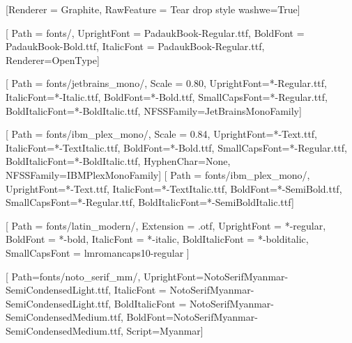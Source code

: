 \setmainfont[
    Path = fonts/,
    UprightFont = PadaukBook-Regular.ttf,
    BoldFont = PadaukBook-Bold.ttf,
    ItalicFont = PadaukBook-Regular.ttf,    
]{Padauk Book}
[Renderer = Graphite, RawFeature = {Tear drop style washwe=True}]

[
    Path = fonts/,
    UprightFont = PadaukBook-Regular.ttf,
    BoldFont = PadaukBook-Bold.ttf,
    ItalicFont = PadaukBook-Regular.ttf,
    Renderer=OpenType]
\DeclareTextFontCommand{\textpadauk}{\padaukfamily}

[
    Path = fonts/jetbrains_mono/,
    Scale = 0.80,
    UprightFont=*-Regular.ttf,
    ItalicFont=*-Italic.ttf,
    BoldFont=*-Bold.ttf,
    SmallCapsFont=*-Regular.ttf,
    BoldItalicFont=*-BoldItalic.ttf,
    NFSSFamily=JetBrainsMonoFamily]
\DeclareTextFontCommand{\textjetbrainsmono}{\jetbrainsmonofamily}

[
    Path = fonts/ibm_plex_mono/,
    Scale = 0.84,
    UprightFont=*-Text.ttf,
    ItalicFont=*-TextItalic.ttf,
    BoldFont=*-Bold.ttf,
    SmallCapsFont=*-Regular.ttf,
    BoldItalicFont=*-BoldItalic.ttf,
    HyphenChar=None,
    NFSSFamily=IBMPlexMonoFamily]
\DeclareTextFontCommand{\textibmplexmono}{\ibmplexmonofamily}
[
    Path = fonts/ibm_plex_mono/,
    UprightFont=*-Text.ttf,
    ItalicFont=*-TextItalic.ttf,
    BoldFont=*-SemiBold.ttf,
    SmallCapsFont=*-Regular.ttf,
    BoldItalicFont=*-SemiBoldItalic.ttf]
\DeclareTextFontCommand{\textibmplexmonoa}{\ibmplexmonofamilya}

%
[
    Path = fonts/latin_modern/,
    Extension = .otf,
    UprightFont = *-regular, 
    BoldFont = *-bold,
    ItalicFont = *-italic,
    BoldItalicFont = *-bolditalic,
    SmallCapsFont = lmromancaps10-regular
]
\DeclareTextFontCommand{\textlatinmodern}{\latinmodernfamily}

[
    Path=fonts/noto_serif_mm/,
    UprightFont=NotoSerifMyanmar-SemiCondensedLight.ttf,
    ItalicFont = NotoSerifMyanmar-SemiCondensedLight.ttf,
    BoldItalicFont = NotoSerifMyanmar-SemiCondensedMedium.ttf,
    BoldFont=NotoSerifMyanmar-SemiCondensedMedium.ttf, Script=Myanmar]
\DeclareTextFontCommand{\textnotoserifmm}{\notoserifmmfamily}


